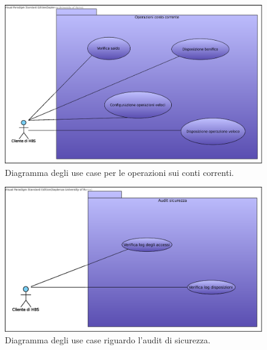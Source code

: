 \begin{figure}
	\centering
	\includegraphics[width=\textwidth]{Images/use-cases/Operazioni_conto_corrente.eps}
	\caption{Diagramma degli use case per le operazioni sui conti correnti.}
	\label{fig:use-cases:clienti:operazioni-conto-corrente}
\end{figure}

\begin{figure}
	\centering
	\includegraphics[width=\textwidth]{Images/use-cases/Audit_sicurezza.eps}
	\caption{Diagramma degli use case riguardo l'audit di sicurezza.}
	\label{fig:use-cases:clienti:audit-sicurezza}
\end{figure}
